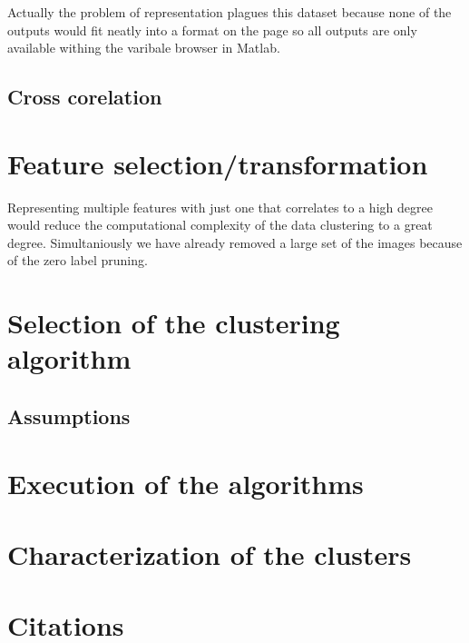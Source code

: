 \documentclass[12pt, a4paper]{article}
\begin{document}
Actually the problem of representation plagues this dataset because none of the outputs would fit neatly into a format on the page so all outputs are only available withing the varibale browser in Matlab.
\newline

\subsection{Cross corelation}

\section{Feature selection/transformation}

Representing multiple features with just one that correlates to a high degree would reduce the computational complexity of the data clustering to a great degree. Simultaniously we have already removed a large set of the images because of the zero label pruning.

\section{Selection of the clustering algorithm}

\subsection{Assumptions}

\section{Execution of the algorithms}

\section{Characterization of the clusters}

\section{Citations}
\end{document}
